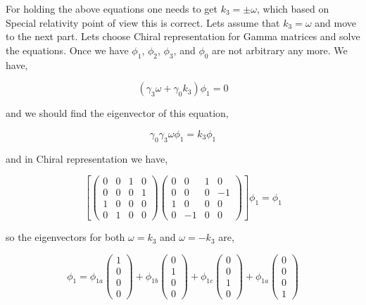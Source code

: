 For holding the above equations one needs to get $k_{3} =\pm \omega$, which based on Special relativity point of view this is correct. Lets assume that $k_{3} = \omega$ and move to the next part. Lets choose Chiral representation for Gamma matrices and solve the equations. Once we have $\phi_{1}$, $\phi_{2}$, $\phi_{3}$, and $\phi_{0}$ are not arbitrary any more. We have,

\begin{equation}
   (\gamma_{3}\omega + \gamma_{0}k_3)\phi_{1} = 0
\end{equation}

and we should find the eigenvector of this equation,

\begin{equation}
   \gamma_{0}\gamma_{3}\omega\phi_{1} = k_3\phi_{1}
\end{equation}

and in Chiral representation we have,

\begin{equation}
   \left[ \begin{pmatrix} 0 & 0 & 1 & 0 \\ 0 & 0 & 0 & 1 \\ 1 & 0 & 0 & 0 \\ 0 & 1 & 0 & 0 \end{pmatrix} \begin{pmatrix} 0 & 0 & 1 & 0 \\ 0 & 0 & 0 & -1 \\ 1 & 0 & 0 & 0 \\ 0 & -1 & 0 & 0 \end{pmatrix} \right] \phi_{1} = \phi_{1}
\end{equation} 

so the eigenvectors for both $\omega=k_3$ and $\omega=-k_3$ are,

\begin{equation}
    \phi_{1} = \phi_{1a}\begin{pmatrix} 1 \\ 0 \\  0 \\ 0 \end{pmatrix} + \phi_{1b}\begin{pmatrix} 0 \\ 1 \\  0 \\ 0 \end{pmatrix} + \phi_{1c}\begin{pmatrix} 0 \\ 0 \\  1 \\ 0 \end{pmatrix} + \phi_{1a}\begin{pmatrix} 0 \\ 0 \\  0 \\ 1 \end{pmatrix}
\end{equation} 

